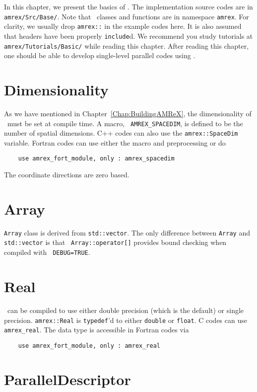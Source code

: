 In this chapter, we present the basics of \amrex.  The implementation
source codes are in {\tt amrex/Src/Base/}.  Note that \amrex\ classes
and functions are in namespace {\tt amrex}.  For clarity, we usually
drop {\tt amrex::} in the example codes here.  It is also assumed that
headers have been properly {\tt include}d.  We recommend you study
tutorials at {\tt amrex/Tutorials/Basic/} while reading this chapter.
After reading this chapter, one should be able to develop single-level
parallel codes using \amrex.

\section{Dimensionality}
\label{sec:basics:dim}

As we have mentioned in Chapter~\ref{Chap:BuildingAMReX}, the
dimensionality of \amrex\ must be set at compile time.  A macro, {\tt
  AMREX\_SPACEDIM}, is defined to be the number of spatial
dimensions.  C++ codes can also use the {\tt amrex::SpaceDim}
variable.  Fortran codes can use either the macro and preprocessing or
do 
\begin{verbatim}
    use amrex_fort_module, only : amrex_spacedim
\end{verbatim}
The coordinate directions are zero based. 

\section{Array}

{\tt Array} class is derived from {\tt std::vector}.  The only
difference between {\tt Array} and {\tt std::vector} is that {\tt
  Array::operator[]} provides bound checking when compiled with {\tt
  DEBUG=TRUE}. 

\section{Real}

\amrex\ can be compiled to use either double precision (which is the
default) or single precision.  {\tt amrex::Real} is {\tt typedef}'d to
either {\tt double} or {\tt float}.  C codes can use {\tt
  amrex\_real}.  The data type is accessible in Fortran codes via
\begin{verbatim}
    use amrex_fort_module, only : amrex_real
\end{verbatim}

\section{ParallelDescriptor}

